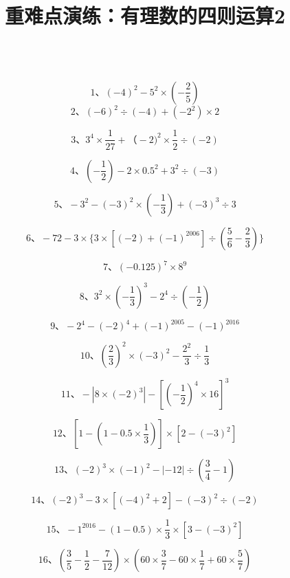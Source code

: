 \documentclass[fleqn]{article}
\title{重难点演练：有理数的四则运算2}
\begin{document}
  \hspace{4cm}{\Large 重难点演练3：有理数的混合运算}
  \\
	\noindent\[\text{1、}(-4)^2-5^2\times(-\frac25)\]
	\[\text{2、}(-6)^2\div(-4)+(-2^2)\times2\]

	\[\text{3、}3^4\times\frac1{27}+（-2)^2\times\frac12\div(-2)\]

	\[\text{4、}(-\frac12)-2\times0.5^2+3^2\div(-3)\]

	\[\text{5、}-3^2-(-3)^2\times(-\frac13)+(-3)^3\div3\]

	\[\text{6、}-72-3\times\{3\times[(-2)+(-1)^{2006}]\div(\frac56-\frac23)\}\]

	\[\text{7、}(-0.125)^7\times8^9\]

	\[\text{8、}3^2\times(-\frac13)^3-2^4\div(-\frac12)\]

	\[\text{9、}-2^4-(-2)^4+(-1)^{2005}-(-1)^{2016}\]

	\[\text{10、}(\frac23)^2\times(-3)^2-\frac{2^2}3\div\frac13\]

	\[\text{11、}-|8\times(-2)^3|-[(-\frac12)^4\times16]^3\]

	\[\text{12、}[1-(1-0.5\times\frac13)]\times[2-(-3)^2]\]

	\[\text{13、}(-2)^3\times(-1)^2-|-12|\div(\frac34-1)\]

	\[\text{14、}(-2)^3-3\times[(-4)^2+2]-(-3)^2\div(-2)\]

	\[\text{15、}-1^{2016}-(1-0.5)\times\frac13\times[3-(-3)^2]\]

	\[\text{16、}(\frac35-\frac12-\frac7{12})\times(60\times\frac37-60\times\frac17+60\times\frac57)\]
\end{document}
